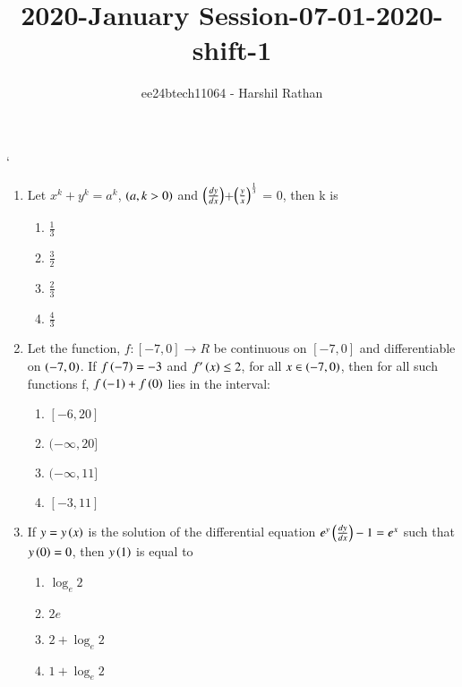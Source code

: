 \documentclass[journal,12pt,twocolumn]{IEEEtran}
\theoremstyle{remark}
\begin{document}

\vspace{3cm}

\title{2020-January Session-07-01-2020-shift-1}
\author{ee24btech11064 - Harshil Rathan}
\maketitle
\newpage
\bigskip

\renewcommand{\thefigure}{\theenumi}
`\renewcommand{\thetable}{\theenumi}
\begin{enumerate}
\item Let $x^k + y^k = a^k$, $\left(a,k>0\right)$ and $\left(\frac{dy}{dx}\right)$+$\left(\frac{y}{x}\right)^\frac{1}{3}$ = $0$, then k is 
\begin{multicols}{2}
\begin{enumerate}
    \item $\frac{1}{3}$
    \item $\frac{3}{2}$
    \item $\frac{2}{3}$
    \item $\frac{4}{3}$ 
\end{enumerate}
\end{multicols}
\item Let the function, $f:[-7,0]\rightarrow R$ be continuous on $[-7,0]$ and differentiable on $\left(-7,0\right)$. If $f\left(-7\right)=-3$ and $f'\left(x\right) \leq 2$, for all $x \in \left(-7,0\right)$, then for all such functions f, $f\left(-1\right)+f\left(0\right)$ lies in the interval:
\begin{multicols}{2}
\begin{enumerate}
    \item $[-6,20]$
    \item $(-\infty,20]$
    \item $(-\infty,11]$
    \item $[-3,11]$
\end{enumerate}
\end{multicols}
\item If $y = y\left(x\right)$ is the solution of the differential equation $e^y\left(\frac{dy}{dx}\right)-1=e^x$ such that $y\left(0\right)=0$, then $y\left(1\right)$ is equal to
\begin{multicols}{2}
\begin{enumerate}
       \item $\log_e2$
       \item $2e$
       \item $2+\log_e2$
       \item $1+\log_e2$
\end{enumerate}

\end{multicols}
\end{enumerate}
\end{document}
